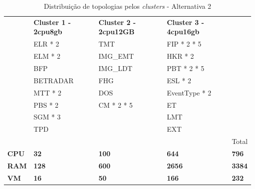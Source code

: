 \begin{table}[h!]
  \centering
  \begin{tabular}{|l|l|l|l|l|}
    \hline
    \rowcolor[HTML]{FBE6A3} 
    \multicolumn{5}{|c|}{\textbf{Alternativa 2}} \\ \hline
    \rowcolor[HTML]{4EAC5B} 
    \cellcolor{white} & \textbf{Cluster 1 - 2cpu8gb} & \textbf{Cluster 2 - 2cpu12GB} & \textbf{Cluster 3 - 4cpu16gb} & \cellcolor{white} \\ \hline
    \cellcolor{white} & \cellcolor[HTML]{A9D08E} ELR * 2 & \cellcolor[HTML]{BDD7EE} TMT  & \cellcolor[HTML]{A9D08E} FIP * 2 * 5 & \cellcolor{white} \\ \hline
    \cellcolor{white} & \cellcolor[HTML]{A9D08E} ELM * 2 & \cellcolor[HTML]{BDD7EE} IMG\_EMT  & \cellcolor[HTML]{A9D08E} HKR * 2 & \cellcolor{white} \\ \hline
    \cellcolor{white} & \cellcolor[HTML]{A9D08E} BFP & \cellcolor[HTML]{BDD7EE} IMG\_LDT  & \cellcolor[HTML]{A9D08E} PBT * 2 * 5 & \cellcolor{white} \\ \hline
    \cellcolor{white} & \cellcolor[HTML]{A9D08E} BETRADAR & \cellcolor[HTML]{BDD7EE} FHG  & \cellcolor[HTML]{A9D08E} ESL * 2 &  \cellcolor{white} \\ \hline
    \cellcolor{white} & \cellcolor[HTML]{BDD7EE} MTT * 2 & \cellcolor[HTML]{BDD7EE} DOS  & \cellcolor[HTML]{A9D08E} EventType * 2 & \cellcolor{white} \\ \hline
    \cellcolor{white} & \cellcolor[HTML]{BDD7EE} PBS * 2 & \cellcolor[HTML]{BDD7EE} CM * 2 * 5  & \cellcolor[HTML]{BDD7EE} ET  & \cellcolor{white} \\ \hline
    \cellcolor{white} & \cellcolor[HTML]{BDD7EE} SGM * 3 & \cellcolor{white} & \cellcolor[HTML]{BDD7EE} LMT & \cellcolor{white} \\ \hline
    \cellcolor{white} & \cellcolor[HTML]{BDD7EE} TPD & \cellcolor{white} & \cellcolor[HTML]{BDD7EE} EXT & \cellcolor{white} \\ \hline
    \cellcolor{white} & \cellcolor{white} & \cellcolor{white} & \cellcolor{white} & Total \cellcolor{white} \\ \hline

    \rowcolor[HTML]{D9D9D9} 
    \textbf{CPU} & \textbf{32} & \textbf{100} & \textbf{644} & \textbf{796} \\ \hline
    \rowcolor[HTML]{D9D9D9} 
    \textbf{RAM} & \textbf{128} & \textbf{600} & \textbf{2656} & \textbf{3384} \\ \hline
    \rowcolor[HTML]{D9D9D9} 
    \textbf{VM} & \textbf{16} & \textbf{50} & \textbf{166} & \textbf{232} \\ \hline
  \end{tabular}
  \caption{Distribuição de topologias pelos \textit{clusters} - Alternativa 2}
  \label{tab:proposal-2}
\end{table}

